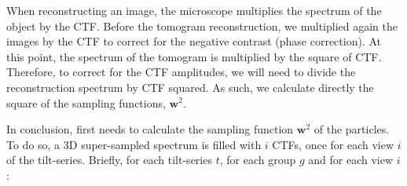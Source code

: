 When reconstructing an image, the microscope multiplies the spectrum of the object by the CTF. Before the tomogram reconstruction, we multiplied again the images by the CTF to correct for the negative contrast (phase correction). At this point, the spectrum of the tomogram is multiplied by the square of CTF. Therefore, to correct for the CTF amplitudes, we will need to divide the reconstruction spectrum by CTF squared. As such, we calculate directly the square of the sampling functions, $\bm{w}^2$.

In conclusion, {\emClarity} first needs to calculate the sampling function $\bm{w}^2$ of the particles. To do so, a 3D super-sampled spectrum is filled with $i$ CTFs, once for each view $i$ of the tilt-series. Briefly, for each tilt-series $t$, for each group $g$ and for each view $i$:

